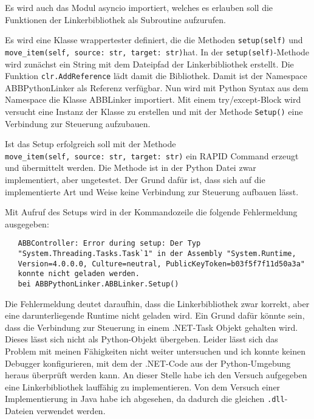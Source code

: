 Es wird auch das Modul \glq asyncio\grq{} importiert, welches es erlauben soll die Funktionen der Linkerbibliothek als Subroutine aufzurufen. 

Es wird eine Klasse \glq wrappertester\grq{} definiert, die die Methoden \verb|setup(self)| und \\ \verb|move_item(self, source: str, target: str)|hat.
In der \verb|setup(self)|-Methode wird zunächst ein String mit dem Dateipfad der Linkerbibliothek erstellt. 
Die Funktion \verb|clr.AddReference| lädt damit die Bibliothek.
Damit ist der Namespace \glq ABBPythonLinker\grq{} als Referenz verfügbar. Nun wird mit Python Syntax aus dem Namespace die Klasse \glq ABBLinker\grq{} importiert.
Mit einem try/except-Block wird versucht eine Instanz der Klasse zu erstellen und mit der Methode \verb|Setup()| eine Verbindung zur Steuerung aufzubauen.

Ist das Setup erfolgreich soll mit der Methode \\
\verb|move_item(self, source: str, target: str)| ein RAPID Command erzeugt und übermittelt werden.
Die Methode ist in der Python Datei zwar implementiert, aber ungetestet. 
Der Grund dafür ist, dass sich auf die implementierte Art und Weise keine Verbindung zur Steuerung aufbauen lässt.

Mit Aufruf des Setups wird in der Kommandozeile die folgende Fehlermeldung ausgegeben: 

\begin{verbatim}
   ABBController: Error during setup: Der Typ 
   "System.Threading.Tasks.Task`1" in der Assembly "System.Runtime, 
   Version=4.0.0.0, Culture=neutral, PublicKeyToken=b03f5f7f11d50a3a" 
   konnte nicht geladen werden.
   bei ABBPythonLinker.ABBLinker.Setup()
\end{verbatim}

Die Fehlermeldung deutet daraufhin, dass die Linkerbibliothek zwar korrekt, aber eine darunterliegende Runtime nicht geladen wird. 
Ein Grund dafür könnte sein, dass die Verbindung zur Steuerung in einem .NET-Task Objekt gehalten wird. Dieses lässt sich nicht als Python-Objekt übergeben.
Leider lässt sich das Problem mit meinen Fähigkeiten nicht weiter untersuchen und ich konnte keinen Debugger konfigurieren, mit dem der .NET-Code aus der Python-Umgebung heraus überprüft werden kann.
An dieser Stelle habe ich den Versuch aufgegeben eine Linkerbibliothek lauffähig zu implementieren.
Von dem Versuch einer Implementierung in Java habe ich abgesehen, da dadurch die gleichen \verb|.dll|-Dateien verwendet werden.

